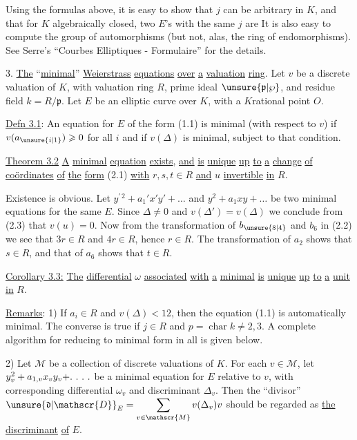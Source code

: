 Using the formulas above, it is easy to show that $j$ can be arbitrary in $K$, and that for $K$ algebraically closed, two $E$'s with the same $j$ are  It is also easy to compute the group of automorphisms (but not, alas, the ring of endomorphisms). See Serre's ``Courbes Elliptiques - Formulaire'' for the details.
\endgroup

3. \uline{The} ``\uline{minimal}'' \uline{Weierstrass} \uline{equations} \uline{over} \uline{a} \uline{valuation} \uline{ring}. Let $v$ be a discrete valuation of $K$, with valuation ring $R$, prime ideal $\unsure{\mathfrak{p}|\wp}$, and residue field $k=R/\mathfrak{p}$. Let $E$ be an elliptic curve over $K$, with a $K$rational point $O$.

\uline{Defn 3.1}: An equation for $E$ of the form (1.1) is minimal (with respect to $v$) if $v(a_{\unsure{i|1}})\geqslant0$ for all $i$ and if $v(\Delta)$ is minimal, subject to that condition.

\uline{Theorem 3.2} \uline{A} \uline{minimal} \uline{equation}  \uline{exists}, \uline{and} \uline{is} \uline{unique} \uline{up} \uline{to} \uline{a} \uline{change} \uline{of} \uline{coördinates} \uline{of} \uline{the} \uline{form} (2.1) \uline{with} $r,s,t\in R$ \uline{and} $u$ \uline{invertible} \uline{in} $R$.

Existence is obvious. Let $y^{\prime\,2}+a_1'x'y'+\ldots$ and $y^2+a_1xy+\ldots$ be two minimal equations for the same $E$. Since $\Delta\ne0$ and $v(\Delta')=v(\Delta)$ we conclude from (2.3) that $v(u)=0$. Now from the transformation of $b_{\unsure{8|4}}$ and $b_6$ in (2.2) we see that $3r\in R$ and $4r\in R$, hence $r\in R$.  The transformation of $a_2$ shows that $s\in R$, and that of $a_6$ shows that $t\in R$.

\uline{Corollary 3.3:} \uline{The} \uline{differential} $\omega$ \uline{associated} \uline{with} \uline{a} \uline{minimal}  \uline{is} \uline{unique} \uline{up} \uline{to} \uline{a} \uline{unit} \uline{in} $R$.

\uline{Remarks}: 1) If $a_i\in R$ and $v(\Delta)<12$, then the equation (1.1) is automatically minimal. The converse is true if $j\in R$ and $p=\operatorname{char}k\ne2,3$. A complete algorithm for reducing to minimal form in all  is given below.

2) Let $\mathscr{M}$ be a collection of discrete valuations of $K$. For each $v\in\mathscr{M}$, let $y_v^2+a_{1,v}x_vy_v+\ldotp\,\ldotp\,\ldotp\,\ldotp$ be a minimal equation for $E$ relative to $v$, with corresponding differential $\omega_v$ and discriminant $\Delta_v$. Then the ``divisor'' $\displaystyle \unsure{\mathfrak{d}|\mathscr{D}}_E=\sum_{v\in\mathscr{M}}v(\Delta_v)v$ should be regarded as \uline{the} \uline{discriminant} \uline{of} $E$.

